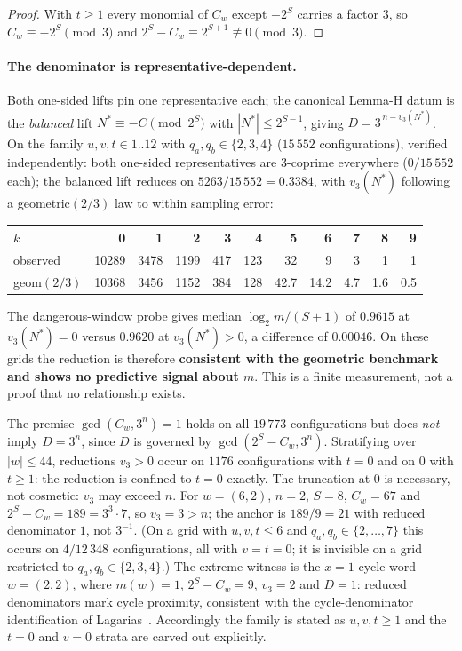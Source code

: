 \documentclass[11pt,a4paper]{article}
\theoremstyle{plain}
\theoremstyle{definition}
\begin{document}
\begin{proof}
With $t\ge 1$ every monomial of $C_w$ except $-2^{S}$ carries a factor $3$, so
$C_w\equiv -2^{S}\pmod 3$ and $2^{S}-C_w\equiv 2^{S+1}\not\equiv 0\pmod 3$.
\end{proof}

\paragraph{The denominator is representative-dependent.}
Both one-sided lifts pin one representative each; the canonical Lemma-H datum
is the \emph{balanced} lift $N^{*}\equiv-C\pmod{2^{S}}$ with
$|N^{*}|\le 2^{S-1}$, giving $D=3^{\,n-v_3(N^{*})}$. On the family $u,v,t\in1..12$ with $q_a,q_b\in\{2,3,4\}$ ($15\,552$
configurations), verified independently: both
one-sided representatives are $3$-coprime everywhere ($0/15\,552$ each); the
balanced lift reduces on $5263/15\,552=0.3384$, with $v_3(N^{*})$ following a
geometric$(2/3)$ law to within sampling error:

\begin{center}\small
\begin{tabular}{@{}lrrrrrrrrrr@{}}
\toprule
$k$ & 0 & 1 & 2 & 3 & 4 & 5 & 6 & 7 & 8 & 9\\
\midrule
observed & 10289 & 3478 & 1199 & 417 & 123 & 32 & 9 & 3 & 1 & 1\\
geom$(2/3)$ & 10368 & 3456 & 1152 & 384 & 128 & 42.7 & 14.2 & 4.7 & 1.6 & 0.5\\
\bottomrule
\end{tabular}
\end{center}

\noindent The dangerous-window probe gives median $\log_2m/(S+1)$ of $0.9615$
at $v_3(N^{*})=0$ versus $0.9620$ at $v_3(N^{*})>0$, a difference of $0.00046$. On these grids the reduction is therefore
\textbf{consistent with the geometric benchmark and shows no predictive signal
about $m$}. This is a finite measurement, not a proof that no relationship
exists.

The premise $\gcd(C_w,3^n)=1$ holds on all $19\,773$ configurations but does
\emph{not} imply $D=3^n$, since $D$ is governed by $\gcd(2^{S}-C_w,3^{n})$.
Stratifying over $|w|\le 44$, reductions $v_3>0$ occur on $1176$
configurations with $t=0$ and on $0$ with $t\ge1$: the reduction is confined to
$t=0$ exactly. The truncation at $0$ is necessary, not cosmetic: $v_3$ may exceed $n$. For
$w=(6,2)$, $n=2$, $S=8$, $C_w=67$ and $2^{S}-C_w=189=3^{3}\cdot7$, so
$v_3=3>n$; the anchor is $189/9=21$ with reduced denominator $1$, not
$3^{-1}$. (On a grid with $u,v,t\le6$ and $q_a,q_b\in\{2,\dots,7\}$ this occurs on
$4/12\,348$ configurations, all with $v=t=0$; it is invisible on a grid
restricted to $q_a,q_b\in\{2,3,4\}$.) The extreme witness is the $x=1$ cycle word
$w=(2,2)$, where
$m(w)=1$, $2^{S}-C_w=9$, $v_3=2$ and $D=1$: reduced denominators mark cycle
proximity, consistent with the cycle-denominator identification of Lagarias~\cite{lagarias1990}. Accordingly the family is stated as $u,v,t\ge1$ and the $t=0$ and
$v=0$ strata are carved out explicitly.
\end{document}
